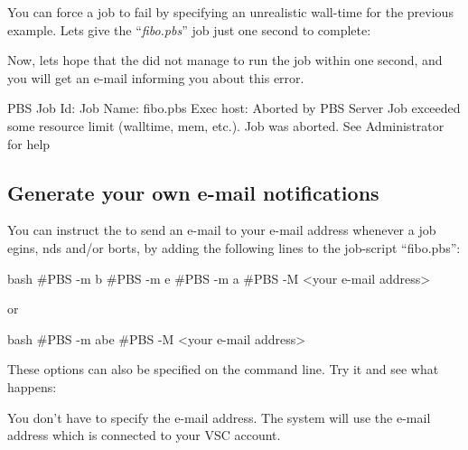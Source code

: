   You can force a job to fail by specifying an unrealistic wall-time for the
  previous example.  Lets give the ``\emph{fibo.pbs}'' job just one second to
  complete:
  
  \begin{prompt}
  \end{prompt}
  
  Now, lets hope that the \hpc did not manage to run the job within one second,
  and you will get an e-mail informing you about this error.
  
  \begin{flattext}
  PBS Job Id: %
  Job Name:   fibo.pbs
  Exec host:  %
  Aborted by PBS Server
  Job exceeded some resource limit (walltime, mem, etc.). Job was aborted.
  See Administrator for help
  \end{flattext}
\fi

\subsection{Generate your own e-mail notifications}

You can instruct the \hpc to send an e-mail to your e-mail address whenever a
job egins, nds and/or borts, by adding the
following lines to the job-script ``fibo.pbs'':

\begin{code}{bash}
#PBS -m b
#PBS -m e
#PBS -m a
#PBS -M <your e-mail address>
\end{code}
or
\begin{code}{bash}
#PBS -m abe
#PBS -M <your e-mail address>
\end{code}

These options can also be specified on the command line.  Try it and see what
happens:

\begin{prompt}
\end{prompt}

You don't have to specify the e-mail address. The system will
use the e-mail address which is connected to your VSC account.

